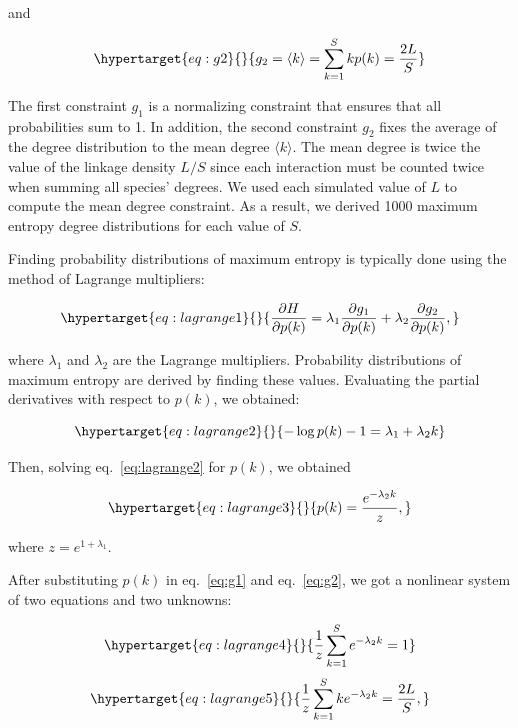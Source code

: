 \documentclass[11pt]{article}
\begin{document}
and

\begin{equation}\protect\hypertarget{eq:g2}{}{g_2 = \langle k \rangle = \sum_{k=1}^{S} k p(k) = \frac{2L}{S}}\label{eq:g2}\end{equation}

The first constraint \(g_1\) is a normalizing constraint that ensures
that all probabilities sum to 1. In addition, the second constraint
\(g_2\) fixes the average of the degree distribution to the mean degree
\(\langle k \rangle\). The mean degree is twice the value of the linkage
density \(L/S\) since each interaction must be counted twice when
summing all species' degrees. We used each simulated value of \(L\) to
compute the mean degree constraint. As a result, we derived 1000 maximum
entropy degree distributions for each value of \(S\).

Finding probability distributions of maximum entropy is typically done
using the method of Lagrange multipliers:

\begin{equation}\protect\hypertarget{eq:lagrange1}{}{\frac{\partial H}{\partial p(k)} = \lambda_1 \frac{\partial g_1}{\partial p(k)} + \lambda_2 \frac{\partial g_2}{\partial p(k)},}\label{eq:lagrange1}\end{equation}

where \(\lambda_1\) and \(\lambda_2\) are the Lagrange multipliers.
Probability distributions of maximum entropy are derived by finding
these values. Evaluating the partial derivatives with respect to
\(p(k)\), we obtained:

\begin{equation}\protect\hypertarget{eq:lagrange2}{}{-\log p(k) - 1 = \lambda_1 + \lambda_2 k}\label{eq:lagrange2}\end{equation}

Then, solving eq.~\ref{eq:lagrange2} for \(p(k)\), we obtained

\begin{equation}\protect\hypertarget{eq:lagrange3}{}{p(k) = \frac{e^{-\lambda_2k}}{z},}\label{eq:lagrange3}\end{equation}

where \(z = e^{1+\lambda_1}\).

After substituting \(p(k)\) in eq.~\ref{eq:g1} and eq.~\ref{eq:g2}, we
got a nonlinear system of two equations and two unknowns:

\begin{equation}\protect\hypertarget{eq:lagrange4}{}{\frac{1}{z}\sum_{k=1}^{S}e^{-\lambda_2k} = 1}\label{eq:lagrange4}\end{equation}
\begin{equation}\protect\hypertarget{eq:lagrange5}{}{\frac{1}{z}\sum_{k=1}^{S}ke^{-\lambda_2k} = \frac{2L}{S},}\label{eq:lagrange5}\end{equation}
\end{document}
